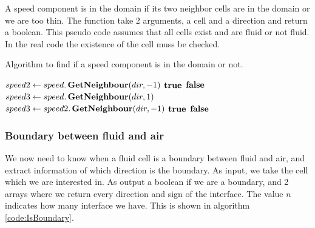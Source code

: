 A speed component is in the domain if its two neighbor cells are in the domain or we are too thin.
The function take 2 arguments, a cell and a direction and return a boolean.
This pseudo code assumes that all cells exist and are fluid or not fluid.
In the real code the existence of the cell muss be checked.

\begin{algorithm}
\caption{Algorithm to find if a speed component is in the domain or not.}\label{euclid}
\begin{algorithmic}[1]
\State $speed2\gets speed.\mathop{\textbf{GetNeighbour}}(dir,-1)$
\State \Return $\mathop{\textbf{true}}$
\EndIf
{}
\State \Return $\mathop{\textbf{false}}$
\EndIf
\State {}
\State $speed3\gets speed.\mathop{\textbf{GetNeighbour}}(dir,1)$ 
\State $speed3\gets speed2.\mathop{\textbf{GetNeighbour}}(dir,-1)$
\EndIf
{}
\State \Return $\mathop{\textbf{true}}$
\EndIf
\State \Return $\mathop{\textbf{false}}$
\EndFunction
\end{algorithmic}
\end{algorithm}

\subsubsection{ Boundary between fluid and air}

We now need to know when a fluid cell is a boundary between fluid and air, and extract information of which direction is the boundary.
As input, we take the cell which we are interested in.
As output a boolean if we are a boundary, and 2 arrays where we return every direction and sign of the interface.
The value $n$ indicates how many interface we have.
This is shown in algorithm \ref{code:IsBoundary}.


